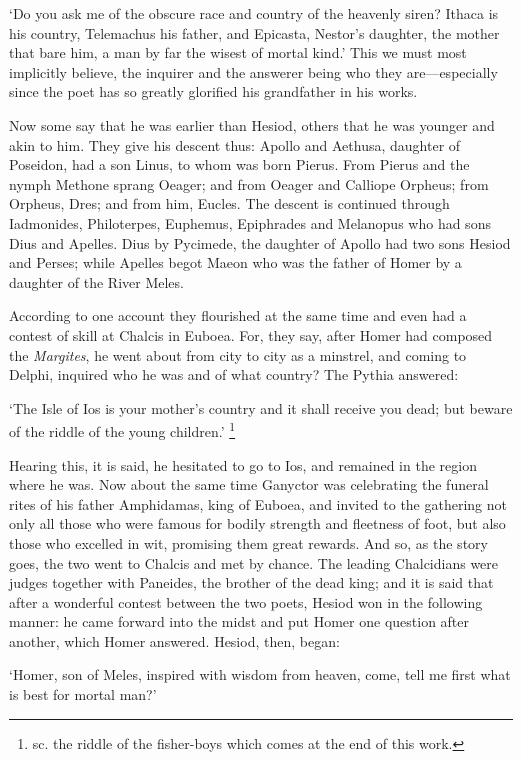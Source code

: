 ‘Do you ask me of the obscure race and country of the heavenly siren?
Ithaca is his country, Telemachus his father, and Epicasta, Nestor’s
daughter, the mother that bare him, a man by far the wisest of mortal
kind.’ This we must most implicitly believe, the inquirer and the
answerer being who they are—especially since the poet has so greatly
glorified his grandfather in his works.

Now some say that he was earlier than Hesiod, others that he was younger and
akin to him. They give his descent thus: Apollo and Aethusa, daughter of
Poseidon, had a son Linus, to whom was born Pierus. From Pierus and the nymph
Methone sprang Oeager; and from Oeager and Calliope Orpheus; from Orpheus,
Dres; and from him, Eucles. The descent is continued through Iadmonides,
Philoterpes, Euphemus, Epiphrades and Melanopus who had sons Dius and Apelles.
Dius by Pycimede, the daughter of Apollo had two sons Hesiod and Perses; while
Apelles begot Maeon who was the father of Homer by a daughter of the River
Meles.

According to one account they flourished at the same time and even had a
contest of skill at Chalcis in Euboea. For, they say, after Homer had composed
the \emph{Margites}, he went about from city to city as a minstrel, and
coming to Delphi, inquired who he was and of what country? The Pythia answered:

‘The Isle of Ios is your mother’s country and it shall receive you
dead; but beware of the riddle of the young children.’ \footnote{sc. the riddle of the
fisher-boys which comes at the end of this work.}

Hearing this, it is said, he hesitated to go to Ios, and remained in the region
where he was. Now about the same time Ganyctor was celebrating the funeral
rites of his father Amphidamas, king of Euboea, and invited to the gathering
not only all those who were famous for bodily strength and fleetness of foot,
but also those who excelled in wit, promising them great rewards. And so, as
the story goes, the two went to Chalcis and met by chance. The leading
Chalcidians were judges together with Paneides, the brother of the dead king;
and it is said that after a wonderful contest between the two poets, Hesiod won
in the following manner: he came forward into the midst and put Homer one
question after another, which Homer answered. Hesiod, then, began:

‘Homer, son of Meles, inspired with wisdom from heaven, come, tell me
first what is best for mortal man?’

